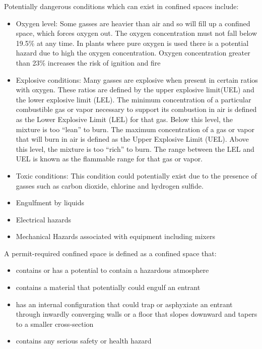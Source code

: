 Potentially dangerous conditions which can exist in confined spaces include: 
\begin{itemize}
\item Oxygen level: Some gasses are heavier than air and so will fill up a confined space, which forces oxygen out.  The oxygen concentration must not fall below 19.5\% at any time.  In plants where pure oxygen is used there is a potential hazard due to high the oxygen concentration.  Oxygen concentration greater than 23\% increases the risk of ignition and fire
\item Explosive conditions:  Many gasses are explosive when present in certain ratios with oxygen. These ratios are defined by the upper explosive limit(UEL) and the lower explosive limit (LEL).  The minimum concentration of a particular combustible gas or vapor necessary to support its combustion in air is defined as the Lower Explosive Limit (LEL) for that gas. Below this level, the mixture is too “lean” to burn. The maximum concentration of a gas
or vapor that will burn in air is defined as the Upper Explosive Limit (UEL). Above this level, the mixture is too “rich” to burn.  The range between the LEL and UEL is known as the flammable range for that gas or vapor.  
\item Toxic conditions:  This condition could potentially exist due to the presence of gasses such as carbon dioxide, chlorine and hydrogen sulfide.
\item Engulfment by liquids
\item Electrical hazards
\item Mechanical Hazards associated with equipment including mixers
\end{itemize}

A permit-required confined space is defined as a confined space that:
\begin{itemize} 
\item contains or has a potential to contain a hazardous atmosphere
\item contains a material that potentially could engulf an entrant
\item has an internal configuration that could trap or asphyxiate an entrant through inwardly converging walls or a floor that slopes downward and tapers to a smaller cross-section
\item contains any serious safety or health hazard
\end{itemize}




